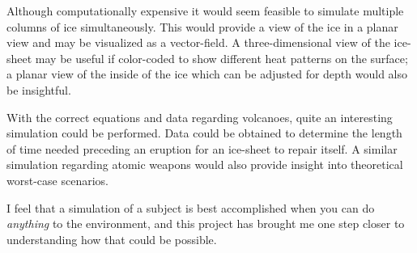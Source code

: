 \documentclass{article}%
\begin{document}
Although computationally expensive it would seem feasible to simulate multiple columns of ice simultaneously.  This would provide a view of the ice in a planar view and may be visualized as a vector-field.  A three-dimensional view of the ice-sheet may be useful if color-coded to show different heat patterns on the surface; a planar view of the inside of the ice which can be adjusted for depth would also be insightful.

With the correct equations and data regarding volcanoes, quite an interesting simulation could be performed.  Data could be obtained to determine the length of time needed preceding an eruption for an ice-sheet to repair itself.  A similar simulation regarding atomic weapons would also provide insight into theoretical worst-case scenarios.

I feel that a simulation of a subject is best accomplished when you can do \emph{anything} to the environment, and this project has brought me one step closer to understanding how that could be possible.
\end{document}

